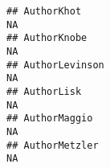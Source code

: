 \documentclass[]{article}
\begin{document}
\begin{verbatim}
## AuthorKhot                                                                                                                                                                                                                                                                                                                                                                                                                                                                           NA
## AuthorKnobe                                                                                                                                                                                                                                                                                                                                                                                                                                                                          NA
## AuthorLevinson                                                                                                                                                                                                                                                                                                                                                                                                                                                                       NA
## AuthorLisk                                                                                                                                                                                                                                                                                                                                                                                                                                                                           NA
## AuthorMaggio                                                                                                                                                                                                                                                                                                                                                                                                                                                                         NA
## AuthorMetzler                                                                                                                                                                                                                                                                                                                                                                                                                                                                        NA

\end{verbatim}
\end{document}
